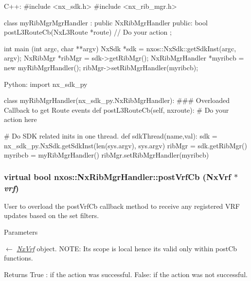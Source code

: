 \begin{DoxyCode}
  C++:
     #include <nx_sdk.h>
     #include <nx_rib_mgr.h>

     class myRibMgrMgrHandler : public NxRibMgrHandler {
        public:
           bool postL3RouteCb(NxL3Route *route) {
                // Do your action
           }
     };

     int  main (int argc, char **argv)
     {
          NxSdk    *sdk = nxos::NxSdk::getSdkInst(argc, argv);
          NxRibMgr *ribMgr = sdk->getRibMgr();
          NxRibMgrHandler *myribcb = new myRibMgrHandler();
          ribMgr->setRibMgrHandler(myribcb);
     }

  Python:
     import nx_sdk_py

     class myRibMgrHandler(nx_sdk_py.NxRibMgrHandler):
     ### Overloaded Callback to get Route events
           def postL3RouteCb(self, nxroute):
               # Do your action here

     # Do SDK related inits in one thread.
     def sdkThread(name,val):
         sdk = nx_sdk_py.NxSdk.getSdkInst(len(sys.argv), sys.argv)
         ribMgr = sdk.getRibMgr()
         myribcb = myRibMgrHandler()
         ribMgr.setRibMgrHandler(myribcb)
\end{DoxyCode}
 \hypertarget{classnxos_1_1NxRibMgrHandler_a2ed5a3ad9c0e55d21e18d88a19419a5e}{
\subsubsection[{postVrfCb}]{\setlength{\rightskip}{0pt plus 5cm}virtual bool nxos::NxRibMgrHandler::postVrfCb ({\bf NxVrf} $\ast$ {\em vrf})}}
\label{classnxos_1_1NxRibMgrHandler_a2ed5a3ad9c0e55d21e18d88a19419a5e}
User to overload the postVrfCb callback method to receive any registered VRF updates based on the set filters. 
\begin{DoxyParams}{Parameters}
\item[\mbox{$\leftarrow$} {\em \hyperlink{classnxos_1_1NxVrf}{NxVrf}}]object. NOTE: Its scope is local hence its valid only within postCb functions.\end{DoxyParams}
\begin{DoxyReturn}{Returns}
True : if the action was successful. False: if the action was not successful.
\end{DoxyReturn}

